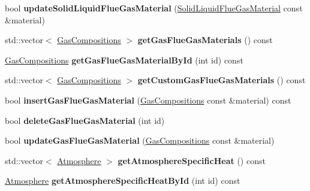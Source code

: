 \begin{DoxyCompactItemize}
bool {\bfseries update\+Solid\+Liquid\+Flue\+Gas\+Material} (\hyperlink{class_solid_liquid_flue_gas_material}{Solid\+Liquid\+Flue\+Gas\+Material} const \&material)
\item 
\mbox{\label{class_s_q_lite_a7f054c9a3a3954277c5de8d4048a40f9}} 
std\+::vector$<$ \hyperlink{class_gas_compositions}{Gas\+Compositions} $>$ {\bfseries get\+Gas\+Flue\+Gas\+Materials} () const
\item 
\mbox{\label{class_s_q_lite_a230049a94b9e2ff84d19fcd5a087954c}} 
\hyperlink{class_gas_compositions}{Gas\+Compositions} {\bfseries get\+Gas\+Flue\+Gas\+Material\+By\+Id} (int id) const
\item 
\mbox{\label{class_s_q_lite_a8cd9d62714f1083bab16e388dabc59be}} 
std\+::vector$<$ \hyperlink{class_gas_compositions}{Gas\+Compositions} $>$ {\bfseries get\+Custom\+Gas\+Flue\+Gas\+Materials} () const
\item 
\mbox{\label{class_s_q_lite_a95d5521ed0de19c979ac9627ae21fbcd}} 
bool {\bfseries insert\+Gas\+Flue\+Gas\+Material} (\hyperlink{class_gas_compositions}{Gas\+Compositions} const \&material) const
\item 
\mbox{\label{class_s_q_lite_a12b38db00e6d8bcff8345e7300a67b26}} 
bool {\bfseries delete\+Gas\+Flue\+Gas\+Material} (int id)
\item 
\mbox{\label{class_s_q_lite_a71c1973e285ccae25b7bb8dbc101770e}} 
bool {\bfseries update\+Gas\+Flue\+Gas\+Material} (\hyperlink{class_gas_compositions}{Gas\+Compositions} const \&material)
\item 
\mbox{\label{class_s_q_lite_a04d22b056b51fb07d192833806eabdfc}} 
std\+::vector$<$ \hyperlink{class_atmosphere}{Atmosphere} $>$ {\bfseries get\+Atmosphere\+Specific\+Heat} () const
\item 
\mbox{\label{class_s_q_lite_ae468835cffed182bb9819299463c53b7}} 
\hyperlink{class_atmosphere}{Atmosphere} {\bfseries get\+Atmosphere\+Specific\+Heat\+By\+Id} (int id) const
\item 
\mbox{\label{class_s_q_lite_adecfb81514a3fa09237baa50b2edf5e7}} 

\end{DoxyCompactItemize}
